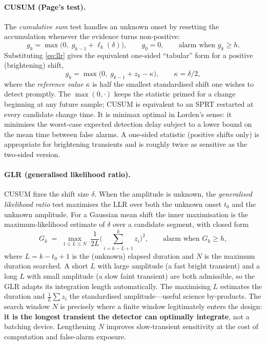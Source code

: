 \documentclass[11pt]{article}
\begin{document}
\paragraph{CUSUM (Page's test).}
The \emph{cumulative sum} test handles an unknown onset by resetting the accumulation
whenever the evidence turns non-positive:
\begin{equation}
  g_k = \max\!\big(0,\; g_{k-1}+\ell_k(\delta)\big),\qquad g_0=0,
  \qquad\text{alarm when } g_k\ge h .
  \label{eq:cusum}
\end{equation}
Substituting \eqref{eq:llr} gives the equivalent one-sided ``tabular'' form for a
positive (brightening) shift,
\begin{equation}
  g_k=\max\big(0,\;g_{k-1}+z_k-\kappa\big),\qquad \kappa=\delta/2,
\end{equation}
where the \emph{reference value} $\kappa$ is half the smallest standardised shift one
wishes to detect promptly. The $\max(0,\cdot)$ keeps the statistic primed for a change
beginning at any future sample; CUSUM is equivalent to an SPRT restarted at every
candidate change time. It is minimax optimal in Lorden's sense: it minimises the
worst-case expected detection delay subject to a lower bound on the mean time between
false alarms. A one-sided statistic (positive shifts only) is appropriate for
brightening transients and is roughly twice as sensitive as the two-sided version.

\paragraph{GLR (generalised likelihood ratio).}
CUSUM fixes the shift size $\delta$. When the amplitude is unknown, the
\emph{generalised likelihood ratio} test maximises the LLR over both the unknown onset
$t_0$ and the unknown amplitude. For a Gaussian mean shift the inner maximisation is
the maximum-likelihood estimate of $\delta$ over a candidate segment, with closed form
\begin{equation}
  G_k \;=\; \max_{1\le L\le N}\ \frac{1}{2L}\Bigg(\sum_{i=k-L+1}^{k} z_i\Bigg)^{\!2},
  \qquad\text{alarm when } G_k\ge h,
  \label{eq:glr}
\end{equation}
where $L=k-t_0+1$ is the (unknown) elapsed duration and $N$ is the maximum duration
searched. A short $L$ with large amplitude (a fast bright transient) and a long $L$
with small amplitude (a slow faint transient) are both admissible, so the GLR adapts
its integration length automatically. The maximising $L$ estimates the duration and
$\tfrac1L\sum z_i$ the standardised amplitude---useful science by-products. The
search window $N$ is precisely where a finite window legitimately enters the design:
\textbf{it is the longest transient the detector can optimally integrate}, not a
batching device. Lengthening $N$ improves slow-transient sensitivity at the cost of
computation and false-alarm exposure.
\end{document}
